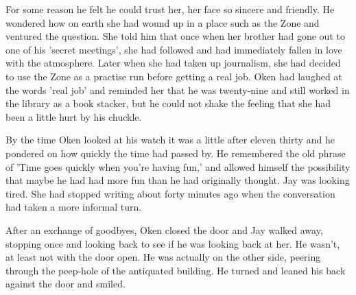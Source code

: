 For some reason he felt he could trust her, her face so sincere and friendly.  He wondered how on earth she had wound up in a place such as the Zone and ventured the question.  She told him that once when her brother had gone out to one of his 'secret meetings', she had followed and had immediately fallen in love with the atmosphere.  Later when she had taken up journalism, she had decided to use the Zone as a practise run before getting a real job.   Oken had laughed at the words 'real job' and reminded her that he was twenty-nine and still worked in the library as a book stacker, but he could not shake the feeling that she had been a little hurt by his chuckle.  

By the time Oken looked at his watch it was a little after eleven thirty and he pondered on how quickly the time had passed by.  He remembered the old phrase of 'Time goes quickly when you're having fun,' and allowed himself the possibility that maybe he had had more fun than he had originally thought.  Jay was looking tired.  She had stopped writing about forty minutes ago when the conversation had taken a more informal turn.

After an exchange of goodbyes, Oken closed the door and Jay walked away, stopping once and looking back to see if he was looking back at her.  He wasn't, at least not with the door open.  He was actually on the other side, peering through the peep-hole of the antiquated building.  He turned and leaned his back against the door  and smiled.



